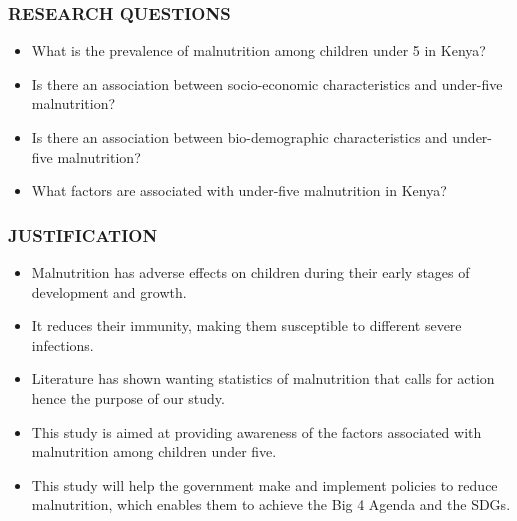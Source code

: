 \begin{frame}
\frametitle{RESEARCH QUESTIONS}
\begin{itemize}
	\item What is the prevalence of malnutrition among children under 5 in Kenya? 
	\item Is there an association between socio-economic characteristics and under-five malnutrition?
	\item Is there an association between bio-demographic characteristics and under-five malnutrition?
	\item What factors are associated with under-five malnutrition in Kenya? 
	
\end{itemize}
\end{frame}
\begin{frame}
\frametitle{JUSTIFICATION}
\begin{itemize}
	\item 	Malnutrition has adverse effects on children during their early stages of development and growth. 
	\item It reduces their immunity, making them susceptible to different severe infections.
	\item Literature has shown wanting statistics of malnutrition that calls for action hence the purpose of our study. 
	\item This study is aimed at providing awareness of the factors associated with malnutrition among children under five.
	\item This study will help the government make and implement policies to reduce malnutrition, which enables them to achieve the Big 4 Agenda and the SDGs. 
\end{itemize}
\end{frame}
